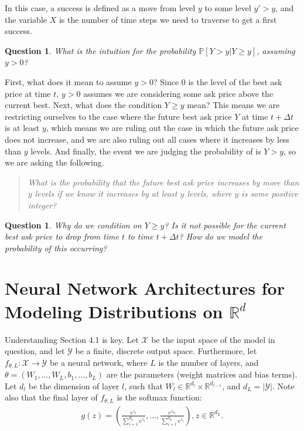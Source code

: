 \documentclass[12pt, reqno]{amsart}
\theoremstyle{definition}
\theoremstyle{definition}
\theoremstyle{plain}
\newtheorem{Ques}[theorem]{Question}
\theoremstyle{definition}
\theoremstyle{remark}
\newcommand{\R}{\mathbb{R}}				%
\newcommand{\bee}{\begin{equation}\begin{aligned}}
\newcommand{\eee}{\end{aligned}\end{equation}}
\newcommand{\fracc}{\frac}				%
\newcommand{\lpar}{\left(}				%
\newcommand{\rpar}{\right)}
\renewcommand{\geq}{\geqslant}			%
\renewcommand{\'}{\hspace{0.5mm}'}			%
\begin{document}
In this case, a success is defined as a move from level $y$ to some level $y' > y$, and the variable $X$ is the number of time steps we need to traverse to get a first success. 

\begin{Ques}
	What is the intuition for the probability $\mathbb{P}[Y > y|Y \geq y]$, assuming $y > 0$?
\end{Ques}

First, what does it mean to assume $y > 0$? Since $0$ is the level of the best ask price at time $t$, $y > 0$ assumes we are considering some ask price above the current best. Next, what does the condition $Y \geq y$ mean? This means we are restricting ourselves to the case where the future best ask price $Y$ at time $t + \Delta t$ is at least $y$, which means we are ruling out the case in which the future ask price does not increase, and we are also ruling out all cases where it increases by less than $y$ levels. And finally, the event we are judging the probability of is $Y > y$, so we are asking the following. 

\begin{quote}
\textit{
	What is the probability that the future best ask price increases by more than $y$ levels if we know it increases by at least $y$ levels, where $y$ is some positive integer?
}
\end{quote}



\begin{Ques}
	Why do we condition on $Y \geq y$? Is it not possible for the current best ask price to drop from time $t$ to time $t + \Delta t$? How do we model the probability of this occurring?
\end{Ques}

\setcounter{section}{3}
\section{Neural Network Architectures for Modeling Distributions on $\R^d$}

Understanding Section 4.1 is key. Let $\mathcal{X}$ be the input space of the model in question, and let $\mathcal{Y}$ be a finite, discrete output space. Furthermore, let $f_{\theta, L}:\mathcal{X} \to \mathcal{Y}$ be a neural network, where $L$ is the number of layers, and $\theta = (W_1, \ldots, W_L, b_1, \ldots, b_L)$ are the parameters (weight matrices and bias terms). 
Let $d_l$ be the dimension of layer $l$, such that 
$W_l \in \R^{d_l} \times \R^{d_{l - 1}}$, and $d_L = |\mathcal{Y}|$. 
Note also that the final layer of $f_{\theta, L}$ is the softmax function:
\bee
	g(z) = 
	\lpar 
		\fracc{
			e^{z_1}
		}{
			\sum_{i = 1}^{d_L} e^{z_i}
		}
		, \ldots, 
		\fracc{
			e^{z_{d_L}}
		}{
			\sum_{i = 1}^{d_L} e^{z_i}
		}
	\rpar, z \in \R^{d_L}.
\eee	
\end{document}
